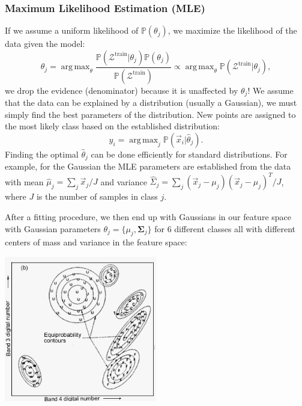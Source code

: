 \documentclass{article}
\DeclareMathOperator*{\argmax}{arg\,max}
\begin{document}
\subsubsection{Maximum Likelihood Estimation (MLE)}
If we assume a uniform likelihood of $\mathbb{P}(\theta_j)$, we maximize the likelihood of the data given the model:
\begin{equation}
    \theta_j = \argmax_{\theta} \frac{\mathbb{P}(\mathcal{Z}^\text{train}|\theta_j)\mathbb{P}(\theta_j)}{\mathbb{P}(\mathcal{Z}^\text{train})} \propto \argmax_{\theta} \mathbb{P}(\mathcal{Z}^\text{train}|\theta_j),
\end{equation}
we drop the evidence (denominator) because it is unaffected by $\theta_j$! We assume that the data can be explained by a distribution (usually a Gaussian), we must simply find the best parameters of the distribution. New points are assigned to the most likely class based on the established distribution:
\begin{equation}
    y_i = \argmax_j \mathbb{P}(\vec{x}_i|\hat{\theta}_j).
\end{equation}
Finding the optimal $\hat{\theta}_j$ can be done efficiently for standard distributions. For example, for the Gaussian the MLE parameters are established from the data with mean $\hat{\mu}_j=\sum_{j} \vec{x}_j/J$ and variance $\hat{\Sigma}_j=\sum_{j}(\vec{x}_j-\mu_j)(\vec{x}_j-\mu_j)^T/J$, where $J$ is the number of samples in class $j$.
\begin{testexample}
    After a fitting procedure, we then end up with Gaussians in our feature space with Gaussian parameters $\theta_j=\{\mu_j,\bm{\Sigma}_j\}$ for 6 different classes all with different centers of mass and variance in the feature space:
    \begin{center}\includegraphics[width=0.5\textwidth,trim={0.5cm 0.35cm 0 0},clip]{MLE_class.jpg}\end{center}
\end{testexample}
\end{document}
